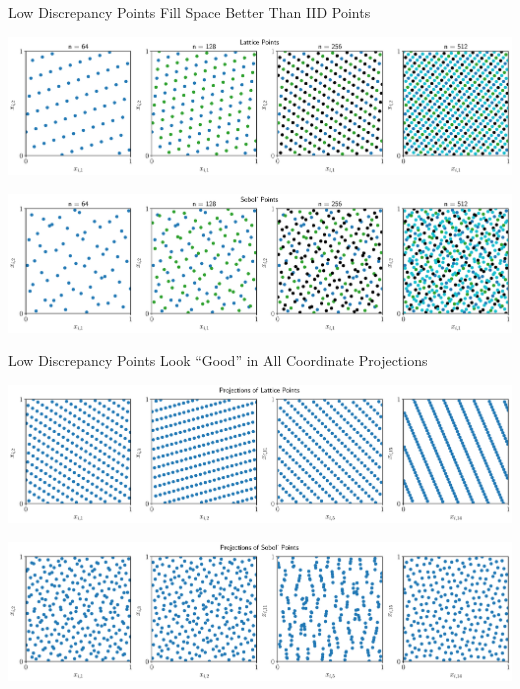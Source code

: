 \documentclass[10pt,compress,xcolor={usenames,dvipsnames},aspectratio=169]{beamer}
\begin{document}
\begin{frame}{Low Discrepancy Points Fill Space Better Than IID Points}
\vspace{-3.2ex}

\includegraphics[width=\textwidth]{latticeptsseq.eps}

\vspace{-4.3ex}

\includegraphics[width=\textwidth]{sobolptsseq.eps}

\end{frame}

\begin{frame}{Low Discrepancy Points Look ``Good'' in All Coordinate Projections}
	\vspace{-3.2ex}

	\includegraphics[width=\textwidth]{latticeptsproj.eps}

	\vspace{-4.3ex}

	\includegraphics[width=\textwidth]{sobolptsproj.eps}


\end{frame}
\end{document}
